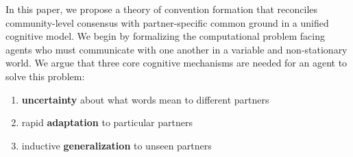 In this paper, we propose a theory of convention formation that reconciles community-level consensus with partner-specific common ground in a unified cognitive model.
We begin by formalizing the computational problem facing agents who must communicate with one another in a variable and non-stationary world. 
We argue that three core cognitive mechanisms are needed for an agent to solve this problem: 
\begin{enumerate}
\item \textbf{uncertainty} about what words mean to different partners
\item rapid \textbf{adaptation} to particular partners
\item  inductive \textbf{generalization} to unseen partners
\end{enumerate}

